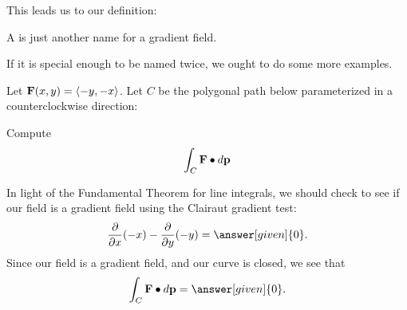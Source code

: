 \documentclass{ximera}
\begin{document}
This leads us to our definition:
\begin{definition}
  A  is just another name for a gradient
  field.
\end{definition}

If it is special enough to be named twice, we ought to do some more
examples.


\begin{example}
  Let $\mathbf{F}(x,y) = \left\langle -y,-x\right\rangle$. Let $C$ be the polygonal path
  below parameterized in a counterclockwise direction:
  \begin{image}
  \end{image}
  Compute
  \[
  \int_C \mathbf{F}\bullet d\mathbf{p}
  \]
  \begin{explanation}
    In light of the Fundamental Theorem for line integrals, we should
    check to see if our field is a gradient field using the Clairaut
    gradient test:
    \[
    \pp{x}(-x)-\pp{y}(-y) = \answer[given]{0}.
    \]
    Since our field is a gradient field, and our curve is closed, we
    see that
    \[
    \int_C \vec{F}\dotp d\vec{p} = \answer[given]{0}.
    \]
  \end{explanation}
\end{example}
\end{document}
